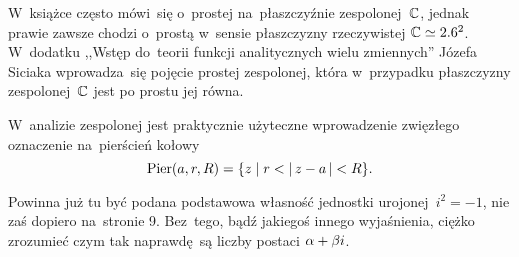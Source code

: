 \documentclass[a4paper,11pt]{article}
\begin{document}
\vspace{\spaceTwo}





\start W~książce często mówi~się o~prostej na~płaszczyźnie
zespolonej~$\mathbb{C}$, jednak prawie zawsze chodzi o~prostą w~sensie
płaszczyzny rzeczywistej $\mathbb{C} \simeq 2.6^{ 2 }$. W~dodatku ,,Wstęp
do~teorii funkcji analitycznych wielu zmiennych'' Józefa Siciaka
wprowadza~się pojęcie prostej zespolonej, która w~przypadku
płaszczyzny zespolonej~$\mathbb{C}$ jest po prostu jej równa.

\vspace{\spaceFour}


\start W~analizie zespolonej jest praktycznie użyteczne wprowadzenie
zwięzłego oznaczenie na~pierścień kołowy
\begin{equation}
  \label{eq:Leja-01}
  \textrm{Pier}(a, r, R) = \{ z \;|\; r < \left| \,  z - a  \, \right| < R \}.
\end{equation}

\vspace{\spaceFour}


\start {} Powinna już tu być podana podstawowa własność jednostki
urojonej~$i^{ 2 } = -1$, nie zaś dopiero na~stronie 9. Bez~tego, bądź
jakiegoś innego wyjaśnienia, ciężko zrozumieć czym tak naprawdę~są
liczby postaci $\alpha + \beta i$.

\vspace{\spaceFour}
\end{document}
